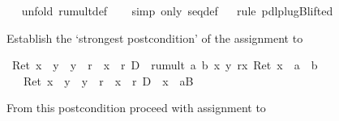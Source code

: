 \begin{isabellebody}
\ \ \isamarkupfalse%
unfold\ rumult{\isacharunderscore}def{\isacharparenright}\ %
\isanewline
\ \ \isamarkupfalse%
simp\ only{\isacharcolon}\ seq{\isacharunderscore}def{\isacharparenright}\isanewline
\ \ \isamarkupfalse%
rule\ pdl{\isacharunderscore}plugB{\isacharunderscore}lifted{}{\isacharparenright}\isamarkupfalse%
%
\begin{isamarkuptxt}%
Establish the `strongest postcondition' of the assignment to 

    \begin{isabelle}%
{\isasymturnstile}\ Ret\ {\isacharparenleft}x\ {\isasymnoteq}\ y\ {\isasymand}\ y\ {\isasymnoteq}\ r\ {\isasymand}\ x\ {\isasymnoteq}\ r{\isacharparenright}\ {\isasymlongrightarrow}\isactrlsub D\ {\isacharbrackleft}{\isacharhash}\ rumult\ a\ b\ x\ y\ r{\isacharbrackright}{\isacharparenleft}{\isasymlambda}x{\isachardot}\ Ret\ {\isacharparenleft}x\ {\isacharequal}\ a\ {\isacharasterisk}\ b{\isacharparenright}{\isacharparenright}\isanewline
\ {}{\isachardot}\ {\isasymturnstile}\ Ret\ {\isacharparenleft}x\ {\isasymnoteq}\ y\ {\isasymand}\ y\ {\isasymnoteq}\ r\ {\isasymand}\ x\ {\isasymnoteq}\ r{\isacharparenright}\ {\isasymlongrightarrow}\isactrlsub D\ {\isacharbrackleft}{\isacharhash}\ x\ {\isacharcolon}{\isacharequal}\ a{\isacharbrackright}{\isacharquery}B%
\end{isabelle}%
\end{isamarkuptxt}%
\isamarkuptrue%
\isamarkupfalse%
\isamarkupfalse%
\isamarkupfalse%
\isamarkupfalse%
\isamarkupfalse%
\isamarkupfalse%
\isamarkupfalse%
%
\begin{isamarkuptxt}%
From this postcondition proceed with assignment to 


\end{isamarkuptxt}
\end{isabellebody}

